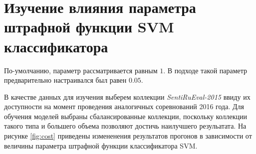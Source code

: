 \section{Изучение влияния параметра штрафной функции SVM классификатора}
По-умолчанию, параметр рассматривается равным $1$. В подходе \cite{modernApproach}
такой параметр предварительно настраивался был равен $0.05$.

В качестве данных для изучения выберем коллекции {\it SentiRuEval-2015} ввиду их
доступности на момент проведения аналогичных соревнований 2016 года. Для
обучения моделей выбраны сбалансированные коллекции, поскольку коллекции такого
типа и большего объема позволяют достичь наилучшего резульатата. На рисунке
\ref{fig:cost} приведены измененения результатов прогонов в зависимости от
величины параметра штрафной функции классификатора SVM.


